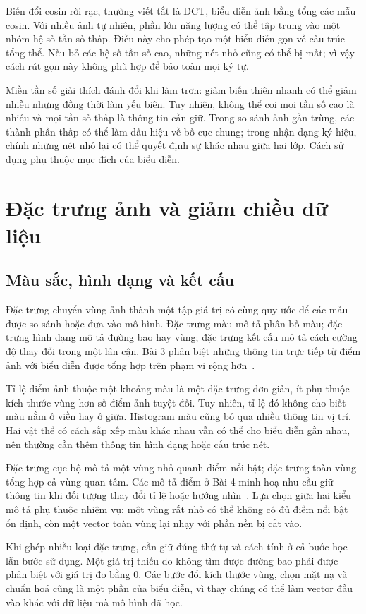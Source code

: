 Biến đổi cosin rời rạc, thường viết tắt là DCT, biểu diễn ảnh bằng tổng các mẫu cosin. Với nhiều ảnh tự nhiên, phần lớn năng lượng có thể tập trung vào một nhóm hệ số tần số thấp. Điều này cho phép tạo một biểu diễn gọn về cấu trúc tổng thể. Nếu bỏ các hệ số tần số cao, những nét nhỏ cũng có thể bị mất; vì vậy cách rút gọn này không phù hợp để bảo toàn mọi ký tự.

Miền tần số giải thích đánh đổi khi làm trơn: giảm biến thiên nhanh có thể giảm nhiễu nhưng đồng thời làm yếu biên. Tuy nhiên, không thể coi mọi tần số cao là nhiễu và mọi tần số thấp là thông tin cần giữ. Trong so sánh ảnh gần trùng, các thành phần thấp có thể làm dấu hiệu về bố cục chung; trong nhận dạng ký hiệu, chính những nét nhỏ lại có thể quyết định sự khác nhau giữa hai lớp. Cách sử dụng phụ thuộc mục đích của biểu diễn.

\section{Đặc trưng ảnh và giảm chiều dữ liệu}
\label{sec:image_features}
\subsection{Màu sắc, hình dạng và kết cấu}
Đặc trưng chuyển vùng ảnh thành một tập giá trị có cùng quy ước để các mẫu được so sánh hoặc đưa vào mô hình. Đặc trưng màu mô tả phân bố màu; đặc trưng hình dạng mô tả đường bao hay vùng; đặc trưng kết cấu mô tả cách cường độ thay đổi trong một lân cận. Bài 3 phân biệt những thông tin trực tiếp từ điểm ảnh với biểu diễn được tổng hợp trên phạm vi rộng hơn~\cite{tailieu_bai3}.

Tỉ lệ điểm ảnh thuộc một khoảng màu là một đặc trưng đơn giản, ít phụ thuộc kích thước vùng hơn số điểm ảnh tuyệt đối. Tuy nhiên, tỉ lệ đó không cho biết màu nằm ở viền hay ở giữa. Histogram màu cũng bỏ qua nhiều thông tin vị trí. Hai vật thể có cách sắp xếp màu khác nhau vẫn có thể cho biểu diễn gần nhau, nên thường cần thêm thông tin hình dạng hoặc cấu trúc nét.

Đặc trưng cục bộ mô tả một vùng nhỏ quanh điểm nổi bật; đặc trưng toàn vùng tổng hợp cả vùng quan tâm. Các mô tả điểm ở Bài 4 minh hoạ nhu cầu giữ thông tin khi đối tượng thay đổi tỉ lệ hoặc hướng nhìn~\cite{tailieu_bai4}. Lựa chọn giữa hai kiểu mô tả phụ thuộc nhiệm vụ: một vùng rất nhỏ có thể không có đủ điểm nổi bật ổn định, còn một vector toàn vùng lại nhạy với phần nền bị cắt vào.

Khi ghép nhiều loại đặc trưng, cần giữ đúng thứ tự và cách tính ở cả bước học lẫn bước sử dụng. Một giá trị thiếu do không tìm được đường bao phải được phân biệt với giá trị đo bằng 0. Các bước đổi kích thước vùng, chọn mặt nạ và chuẩn hoá cũng là một phần của biểu diễn, vì thay chúng có thể làm vector đầu vào khác với dữ liệu mà mô hình đã học.

